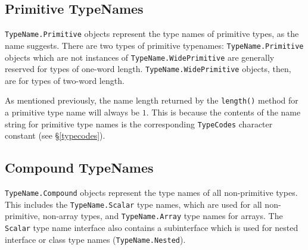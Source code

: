 \documentclass{report}
\begin{document}

\subsection{Primitive TypeNames}\label{primtype}

\texttt{TypeName.Primitive} objects represent the type names of
primitive types, as the name suggests. There are two types of
primitive typenames: \texttt{Type\-Name.Prim\-i\-tive} objects which
are not instances of \texttt{Type\-Name.Wide\-Prim\-i\-tive} are generally
reserved for types of one-word length. \texttt{Type\-Name.Wide\-Prim\-i\-tive}
objects, then, are for types of two-word length. 



As mentioned previously, the name length returned by the \texttt{length()} 
method for a primitive type name will always be $1$. This is because the 
contents of the name string for primitive type names is the corresponding 
\texttt{TypeCodes} character constant (see \S \ref{typecodes}).

\subsection{Compound TypeNames}


\texttt{TypeName.Compound} objects represent the type names of all
non-primitive types. This includes the \texttt{TypeName.Scalar} type names,
which are used for all non-primitive, non-array types, and 
\texttt{TypeName.Array} type names for arrays. The \texttt{Scalar} type name
interface also contains a subinterface which is used for nested interface or 
class type names (\texttt{TypeName.Nested}).
\end{document}

